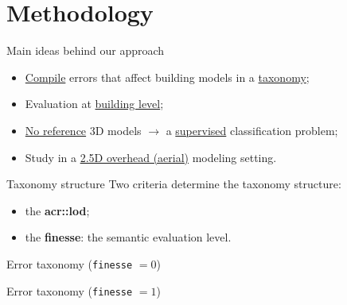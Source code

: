\documentclass[10pt, export]{beamer}
\begin{document}
    \section{Methodology}
        \begin{frame}{Main ideas behind our approach}
            \begin{itemize}[label=$\blacktriangleright$, font=\color{IGNGreen}, itemsep=2em]
                \item<1-> \underline{Compile} errors that affect building models in a \underline{taxonomy};
                \item<2-> Evaluation at \underline{building level};
                \item<3-> \underline{No reference} 3D models $\longrightarrow$ a \underline{supervised} classification problem;
                \item<4-> Study in a \underline{2.5D overhead (aerial)} modeling setting.
            \end{itemize}
        \end{frame}
        \begin{frame}{Taxonomy structure}
            Two criteria determine the taxonomy structure:
            \begin{itemize}[label=$\blacktriangleright$, font=\color{IGNGreen}, itemsep=2em]
                \item<2-> the \textbf{\acrfull{acr::lod}};
                    \begin{figure}
                        \begin{center}
                            
                        \end{center}
                    \end{figure}
                \item<3-> the \textbf{finesse}: the semantic evaluation level.
            \end{itemize}
        \end{frame}
        \begin{frame}{Error taxonomy (\texttt{finesse} $= 0$)}
            \begin{figure}
                
            \end{figure}
        \end{frame}
        \begin{frame}{Error taxonomy (\texttt{finesse} $= 1$)}
            \begin{figure}
                
            \end{figure}
        \end{frame}
\end{document}

